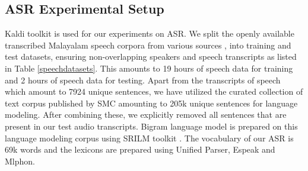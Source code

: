 \documentclass{ieeeaccess}
\begin{document}







\subsection*{ASR Experimental Setup}


Kaldi toolkit \cite{povey2011kaldi} is used for our experiments on ASR. We split the openly available transcribed Malayalam speech corpora from various sources \cite{prahallad2012iiit,baby2016resources, he-etal-2020-open}, into training and test datasets, ensuring non-overlapping speakers and speech transcripts as listed in Table \ref{speechdatasets}. This amounts to 19 hours of speech data for training and 2 hours of speech data for testing. Apart from the transcripts of speech which amount to 7924 unique sentences, we have utilized the curated collection of  text corpus published by SMC \cite{smctext} amounting to 205k unique sentences for language modeling. After combining these, we explicitly removed all sentences that are present in our test audio transcripts. Bigram language model is prepared on this language modeling corpus using SRILM toolkit \cite{stolcke2002srilm}. The  vocabulary of our ASR is 69k words and the lexicons are prepared using Unified Parser, Espeak and Mlphon.
\end{document}
